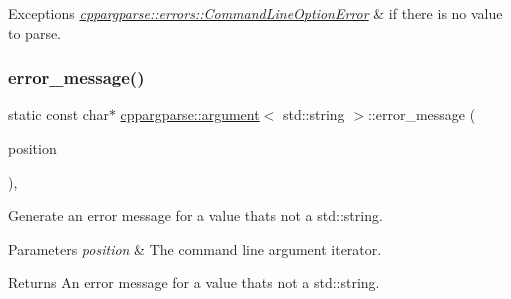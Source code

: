\begin{DoxyExceptions}{Exceptions}
{\em \hyperlink{classcppargparse_1_1errors_1_1CommandLineOptionError}{cppargparse\+::errors\+::\+Command\+Line\+Option\+Error}} & if there is no value to parse. \\
\hline
\end{DoxyExceptions}
\mbox{\label{structcppargparse_1_1argument_3_01std_1_1string_01_4_abf0e56694e3cb65b632759217de194f1}} 
\subsubsection{\texorpdfstring{error\+\_\+message()}{error\_message()}}
{\footnotesize\ttfamily static const char$\ast$ \hyperlink{structcppargparse_1_1argument}{cppargparse\+::argument}$<$ std\+::string $>$\+::error\+\_\+message (\begin{DoxyParamCaption}\item[{const types\+::\+Command\+Line\+Position\+\_\+t \&}]{position }\end{DoxyParamCaption})\hspace{0.3cm}{\ttfamily [inline]}, {\ttfamily [static]}}



Generate an error message for a value that\textquotesingle{}s not a std\+::string. 


\begin{DoxyParams}{Parameters}
{\em position} & The command line argument iterator.\\
\hline
\end{DoxyParams}
\begin{DoxyReturn}{Returns}
An error message for a value that\textquotesingle{}s not a std\+::string. 
\end{DoxyReturn}
\mbox{\label{structcppargparse_1_1argument_3_01std_1_1string_01_4_af0b5a5adbfd58ee818f46f5d42f6f36d}} 
